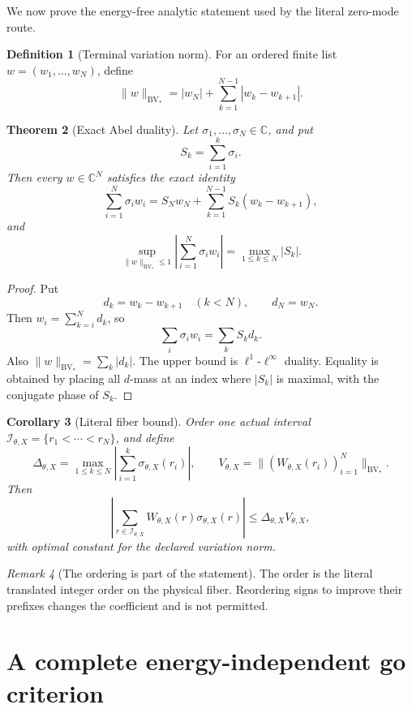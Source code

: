 \documentclass[11pt,a4paper]{article}
\newtheorem{theorem}{Theorem}[section]
\newtheorem{corollary}[theorem]{Corollary}
\theoremstyle{definition}
\newtheorem{definition}[theorem]{Definition}
\theoremstyle{remark}
\newtheorem{remark}[theorem]{Remark}
\newcommand{\C}{\mathbb C}
\newcommand{\cI}{\mathcal I}
\newcommand{\BV}{\mathrm{BV}_*}
\begin{document}
We now prove the energy-free analytic statement used by the literal
zero-mode route.

\begin{definition}[Terminal variation norm]
For an ordered finite list \(w=(w_1,\dots,w_N)\), define
\[
 \|w\|_{\BV}
 =
 |w_N|+\sum_{k=1}^{N-1}|w_k-w_{k+1}|.
\]
\end{definition}

\begin{theorem}[Exact Abel duality]
\label{thm:duality}
Let \(\sigma_1,\dots,\sigma_N\in\C\), and put
\[
 S_k=\sum_{i=1}^k\sigma_i.
\]
Then every \(w\in\C^N\) satisfies the exact identity
\[
 \sum_{i=1}^N\sigma_iw_i
 =
 S_Nw_N+
 \sum_{k=1}^{N-1}S_k(w_k-w_{k+1}),
\]
and
\[
 \boxed{
 \sup_{\|w\|_{\BV}\le1}
 \left|\sum_{i=1}^N\sigma_iw_i\right|
 =
 \max_{1\le k\le N}|S_k|.}
\]
\end{theorem}

\begin{proof}
Put
\[
 d_k=w_k-w_{k+1}\quad(k<N),\qquad d_N=w_N.
\]
Then \(w_i=\sum_{k=i}^Nd_k\), so
\[
 \sum_i\sigma_iw_i=\sum_kS_kd_k.
\]
Also \(\|w\|_{\BV}=\sum_k|d_k|\).  The upper bound is
\(\ell^1\)-\(\ell^\infty\) duality.  Equality is obtained by placing
all \(d\)-mass at an index where \(|S_k|\) is maximal, with the
conjugate phase of \(S_k\).
\end{proof}

\begin{corollary}[Literal fiber bound]
\label{cor:fiber}
Order one actual interval
\(\cI_{\theta,X}=\{r_1<\cdots<r_N\}\), and define
\[
 \Delta_{\theta,X}
 =
 \max_{1\le k\le N}
 \left|\sum_{i=1}^k\sigma_{\theta,X}(r_i)\right|,
\qquad
 V_{\theta,X}
 =
 \|(W_{\theta,X}(r_i))_{i=1}^N\|_{\BV}.
\]
Then
\[
 \left|
 \sum_{r\in\cI_{\theta,X}}
 W_{\theta,X}(r)\sigma_{\theta,X}(r)
 \right|
 \le
 \Delta_{\theta,X}V_{\theta,X},
\]
with optimal constant for the declared variation norm.
\end{corollary}

\begin{remark}[The ordering is part of the statement]
The order is the literal translated integer order on the physical
fiber.  Reordering signs to improve their prefixes changes the
coefficient and is not permitted.
\end{remark}

\section{A complete energy-independent go criterion}
\end{document}
